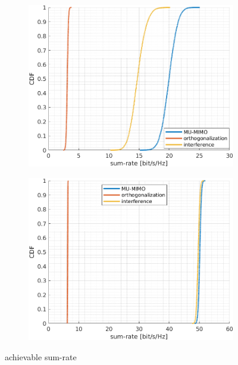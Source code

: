 \documentclass[10pt,a4paper]{article}
\begin{document}
	\begin{figure}
		\begin{subfigure}{0.5\textwidth}

			\includegraphics[width=\textwidth]{result.png}


			\label{fig:res_8}

		\end{subfigure}
		\begin{subfigure}{0.5\textwidth}

			\includegraphics[width=\textwidth]{result_80.png}


			\label{fig:res_80}

		\end{subfigure}

		\caption{achievable sum-rate}

		\label{fig:res}

	\end{figure}

  
  
\end{document}
